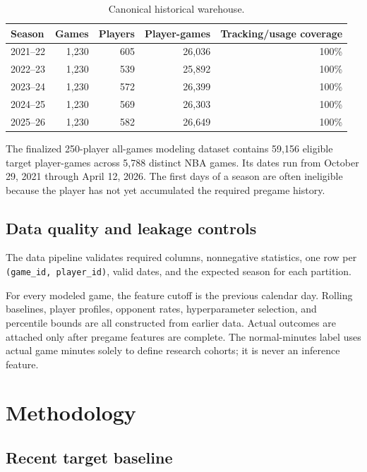 \documentclass[11pt]{article}
\begin{document}
\begin{table}[H]
\centering
\caption{Canonical historical warehouse.}
\label{tab:warehouse}
\small
\begin{tabular}{lrrrr}
\toprule
Season & Games & Players & Player-games & Tracking/usage coverage \\
\midrule
2021--22 & 1,230 & 605 & 26,036 & 100\% \\
2022--23 & 1,230 & 539 & 25,892 & 100\% \\
2023--24 & 1,230 & 572 & 26,399 & 100\% \\
2024--25 & 1,230 & 569 & 26,303 & 100\% \\
2025--26 & 1,230 & 582 & 26,649 & 100\% \\
\bottomrule
\end{tabular}
\end{table}

The finalized 250-player all-games modeling dataset contains 59,156 eligible
target player-games across 5,788 distinct NBA games. Its dates run from October
29, 2021 through April 12, 2026. The first days of a season are often
ineligible because the player has not yet accumulated the required pregame
history.

\subsection{Data quality and leakage controls}

The data pipeline validates required columns, nonnegative statistics, one row
per \texttt{(game\_id, player\_id)}, valid dates, and the expected season for
each partition.

For every modeled game, the feature cutoff is the previous calendar day.
Rolling baselines, player profiles, opponent rates, hyperparameter selection,
and percentile bounds are all constructed from earlier data. Actual outcomes
are attached only after pregame features are complete. The normal-minutes label
uses actual game minutes solely to define research cohorts; it is never an
inference feature.

\section{Methodology}

\subsection{Recent target baseline}
\end{document}
